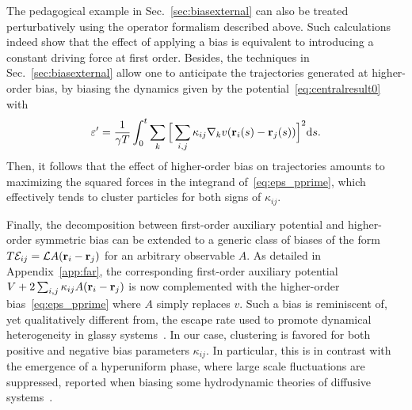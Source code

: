 \documentclass[superscriptaddress, twocolumn, prx, longbibliography, nofootinbib]{revtex4-1}
\begin{document}
The pedagogical example in Sec.~\ref{sec:biasexternal} can also be treated perturbatively using the operator formalism described above. Such calculations indeed show that the effect of applying a bias is equivalent to introducing a constant driving force at first order. Besides, the techniques in Sec.~\ref{sec:biasexternal} allow one to anticipate the trajectories generated at higher-order bias, by biasing the dynamics given by the potential~\eqref{eq:centralresult0} with 
\begin{equation}\label{eq:eps_pprime}
	\varepsilon' = \frac{1}{\gamma T}\int_0^t\sum_k\Big[\sum_{i,j}\kappa_{ij} \nabla_kv({\bf r}_i(s)-{\bf r}_j(s))\Big]^2{\rm d}s .
\end{equation}
Then, it follows that the effect of higher-order bias on trajectories amounts to maximizing the squared forces in the integrand of~\eqref{eq:eps_pprime}, which effectively tends to cluster particles for both signs of $\kappa_{ij}$.


Finally, the decomposition between first-order auxiliary potential and higher-order symmetric bias can be extended to a generic class of biases of the form $T{\cal E}_{ij} = {\cal L} A({\bf r}_i-{\bf r}_j)$ for an arbitrary observable $A$. As detailed in Appendix~\ref{app:far}, the corresponding first-order auxiliary potential $V+2\sum_{i,j}\kappa_{ij}A({\bf r}_i-{\bf r}_j)$ is now complemented with the higher-order bias~\eqref{eq:eps_pprime} where $A$ simply replaces $v$. Such a bias is reminiscent of, yet qualitatively different from, the escape rate used to promote dynamical heterogeneity in glassy systems~\cite{Pitard2011, Fullerton2013}. In our case, clustering is favored for both positive and negative bias parameters $\kappa_{ij}$. In particular, this is in contrast with the emergence of a hyperuniform phase, where large scale fluctuations are suppressed, reported when biasing some hydrodynamic theories of diffusive systems~\cite{Jack2015b}.



\end{document}
